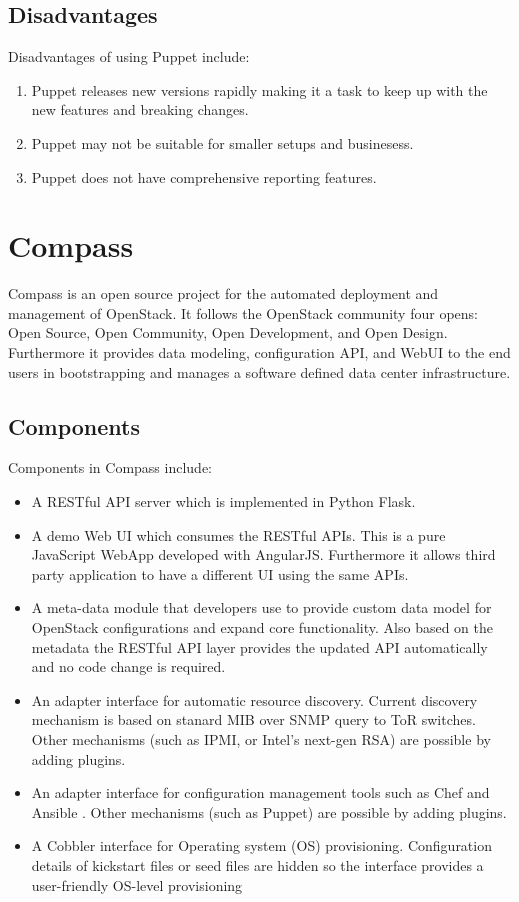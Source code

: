 \documentclass[a4paper, 12pt]{article}
\begin{document}
\subsection{Disadvantages}
Disadvantages of using Puppet include:
\begin{enumerate}
\item
Puppet releases new versions rapidly making it a task to keep up with the new features and breaking changes.
\item
Puppet may not be suitable for smaller setups and businesess.
\item
Puppet does not have comprehensive reporting features.
\end{enumerate}

\newpage
\section{Compass}
Compass is an open source project for the automated deployment and management of OpenStack. It follows the OpenStack community four opens: Open Source, Open Community, Open Development, and Open Design. Furthermore it provides data modeling, configuration API, and WebUI to the end users in bootstrapping and manages a software defined data center infrastructure.

\subsection{Components}
Components in Compass include:
\begin{itemize}
\item
A RESTful API server which is implemented in Python Flask.
\item
A demo Web UI which consumes the RESTful APIs. This is a pure JavaScript WebApp developed with AngularJS. Furthermore it allows third party application to have a different UI using the same APIs.
\item
A meta-data module that developers use to provide custom data model for OpenStack configurations and expand core functionality. Also based on the metadata the RESTful API layer provides the updated API automatically and no code change is required.
\item
An adapter interface for automatic resource discovery. Current discovery mechanism is based on stanard MIB over SNMP query to ToR switches. Other mechanisms (such as IPMI, or Intel's next-gen RSA) are possible by adding plugins.
\item
An adapter interface for configuration management tools such as Chef  and Ansible . Other mechanisms (such as Puppet) are possible by adding plugins.
\item
A Cobbler interface for Operating system (OS) provisioning. Configuration details of kickstart files or seed files are hidden so the interface provides a user-friendly OS-level provisioning
\end{itemize}
\end{document}
